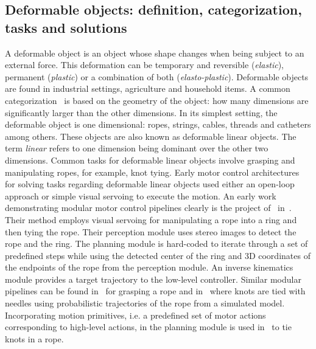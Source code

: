 \subsection{Deformable objects: definition, categorization, tasks and solutions}
A deformable object is an object whose shape changes when being subject to an external force. This deformation can be temporary and reversible (\textit{elastic}), permanent (\textit{plastic}) or a combination of both (\textit{elasto-plastic}). Deformable objects are found in industrial settings, agriculture and household items. A common categorization~\autocite{Saadat2002,Jimenez2012} is based on the geometry of the object: how many dimensions are significantly larger than the other dimensions.
In its simplest setting, the deformable object is one dimensional: ropes, strings, cables, threads and catheters among others. These objects are also known as deformable linear objects. The term \textit{linear} refers to one dimension being dominant over the other two dimensions. Common tasks for deformable linear objects involve grasping and manipulating ropes, for example, knot tying. Early motor control architectures for solving tasks regarding deformable linear objects used either an open-loop approach or simple visual servoing to execute the motion. An early work demonstrating modular motor control pipelines clearly is the project of~\citeauthor{Inaba1987} in~\citeyear{Inaba1987}. Their method employs visual servoing for manipulating a rope into a ring and then tying the rope. Their perception module uses stereo images to detect the rope and the ring. The planning module is hard-coded to iterate through a set of predefined steps while using the detected center of the ring and 3D coordinates of the endpoints of the rope from the perception module. An inverse kinematics module provides a target trajectory to the low-level controller. Similar modular pipelines can be found in~\autocite{Remde1999} for grasping a rope and in~\autocite{Saha2007} where knots are tied with needles using probabilistic trajectories of the rope from a simulated model. Incorporating motion primitives, i.e. a predefined set of motor actions corresponding to high-level actions, in the planning module is used in~\autocite{Yamakawa2008, Vinh2012} to tie knots in a rope.

